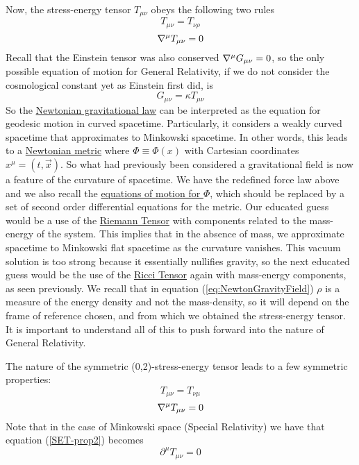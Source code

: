 \documentclass{article}
\begin{document}
 		Now, the stress-energy tensor $T_{\mu\nu}$ obeys the following two rules
 		\begin{equation}
 			\label{eq:SET-1}
 			T_{\mu\nu} = T_{\nu\rho}
 		\end{equation}
 		\begin{equation}
 			\label{eq:SET-2}
 			\nabla^\mu T_{\mu\nu} = 0
 		\end{equation}
 		Recall that the Einstein tensor was also conserved $\nabla^\mu G_{\mu\nu} = 0$, so the only possible equation of motion for General Relativity, if we do not consider the cosmological constant yet as Einstein first did, is
 		\begin{equation}
 			\label{eq:EFE-wrong}
 			\boxed{G_{\mu\nu} = \kappa T_{\mu\nu}}
 		\end{equation}
 		So the \hyperref[eq:NewtonGravitation]{Newtonian gravitational law} can be interpreted as the equation for geodesic motion in curved spacetime. Particularly, it considers a weakly curved spacetime that approximates to Minkowski spacetime. In other words, this leads to a \hyperref[eq:NewtonianGeometry]{Newtonian metric} where $\Phi \equiv \Phi \left( x \right)$ with Cartesian coordinates $x^\mu = \left(t, \vec{x}\right)$. So what had previously been considered a gravitational field is now a feature of  the curvature of spacetime. We have the redefined force law above and we also recall the \hyperref[eq:NewtonGravityField]{equations of motion for $\Phi$}, which should be replaced by a set of second order differential equations for the metric. Our educated guess would be a use of the \hyperref[eq:RiemannTensor]{Riemann Tensor} with components related to the mass-energy of the system. This implies that in the absence of mass, we approximate spacetime to Minkowski flat spacetime as the curvature vanishes. This vacuum solution is too strong because it essentially nullifies gravity, so the next educated guess would be the use of the \hyperref[eq:RicciTensor]{Ricci Tensor} again with mass-energy components, as seen previously. We recall that in equation (\ref{eq:NewtonGravityField}) $\rho$ is a measure of the energy density and not the mass-density, so it will depend on the frame of reference chosen, and from which we obtained the stress-energy tensor. It is important to understand all of this to push forward into the nature of General Relativity.
 		
 		The nature of the symmetric (0,2)-stress-energy tensor leads to a few symmetric properties:
 		\begin{equation}
 			\label{SET-prop1}
 			T_{\mu\nu} = T_{\nu\mu}
 		\end{equation} 
 		\begin{equation}
 			\label{SET-prop2}
 			\nabla^\mu T_{\mu\nu} = 0 
 		\end{equation} 
 		Note that in the case of Minkowski space (Special Relativity) we have that equation (\ref{SET-prop2}) becomes 
 		$$ \partial^\mu T_{\mu\nu} = 0$$
 		
\end{document}
